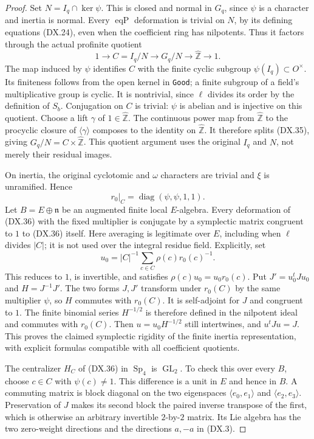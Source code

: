 \begin{proof}
Set $N=I_q\cap\ker\psi$.  This is closed and normal in
$G_q$, since $\psi$ is a character and inertia is normal.
Every $\operatorname{eqP}$ deformation is trivial on $N$,
by its defining equations (DX.24), even when the coefficient
ring has nilpotents.  Thus it factors through the actual
profinite quotient
\[
  1\longrightarrow C=I_q/N
    \longrightarrow G_q/N
    \longrightarrow\widehat{\mathbb Z}\longrightarrow1 .
 \tag{DX.35}
\]
The map induced by $\psi$ identifies $C$ with the finite
cyclic subgroup $\psi(I_q)\subset O^\times$.
Its finiteness follows from the open kernel in
\texttt{Good}; a finite subgroup of a field's multiplicative
group is cyclic.
It is nontrivial, since $\ell$ divides its order by the
definition of $S_b$.
Conjugation on $C$ is trivial: $\psi$ is abelian and is
injective on this quotient.
Choose a lift $\gamma$ of $1\in\widehat{\mathbb Z}$.
The continuous power map from $\widehat{\mathbb Z}$ to the
procyclic closure of $\langle\gamma\rangle$ composes to the
identity on $\widehat{\mathbb Z}$.
It therefore splits (DX.35), giving
$G_q/N=C\times\widehat{\mathbb Z}$.
This quotient argument uses the original $I_q$ and $N$,
not merely their residual images.

On inertia, the original cyclotomic and $\omega$ characters
are trivial and $\xi$ is unramified.  Hence
\[
               r_0|_C=\operatorname{diag}(\psi,\psi,1,1).
 \tag{DX.36}
\]
Let $B=E\oplus\mathfrak n$ be an augmented finite local
$E$-algebra.  Every deformation of (DX.36) with the fixed
multiplier is conjugate by a symplectic matrix congruent
to $1$ to (DX.36) itself.
Here averaging is legitimate over $E$, including when
$\ell$ divides $|C|$; it is not used over the integral
residue field.
Explicitly, set
\[
                 u_0=|C|^{-1}\sum_{c\in C}
                                      \rho(c)r_0(c)^{-1}.
 \tag{DX.37}
\]
This reduces to $1$, is invertible, and satisfies
$\rho(c)u_0=u_0r_0(c)$.
Put $J'=u_0^tJu_0$ and $H=J^{-1}J'$.
The two forms $J,J'$ transform under $r_0(C)$ by the
same multiplier $\psi$, so $H$ commutes with $r_0(C)$.
It is self-adjoint for $J$ and congruent to $1$.
The finite binomial series $H^{-1/2}$ is therefore
defined in the nilpotent ideal and commutes with $r_0(C)$.
Then
$u=u_0H^{-1/2}$ still intertwines, and
$u^tJu=J$.
This proves the claimed symplectic rigidity of the
finite inertia representation, with explicit formulas
compatible with all coefficient quotients.

The centralizer $H_C$ of (DX.36) in $\operatorname{Sp}_4$
is $\operatorname{GL}_2$.
To check this over every $B$, choose $c\in C$ with
$\psi(c)\ne1$.  This difference is a unit in $E$ and
hence in $B$.  A commuting matrix is block diagonal on
the two eigenspaces $\langle e_0,e_1\rangle$ and
$\langle e_2,e_3\rangle$.
Preservation of $J$ makes its second block the paired
inverse transpose of the first, which is otherwise an
arbitrary invertible $2$-by-$2$ matrix.
Its Lie algebra has the two zero-weight directions
and the directions $a,-a$ in (DX.3).


\end{proof}

